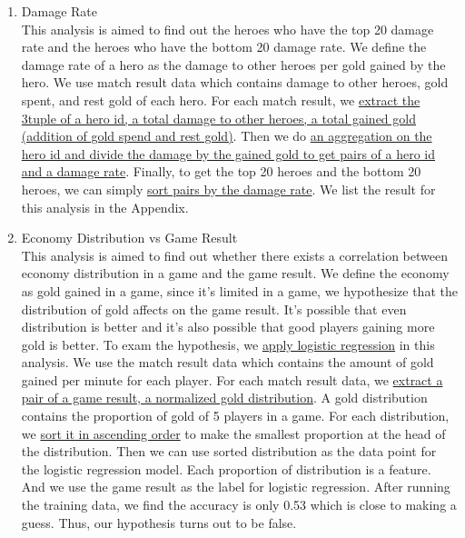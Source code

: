 \documentclass{article}
\begin{document}
\begin{enumerate}
    \item Damage Rate \\
    This analysis is aimed to find out the heroes who have the top 20 damage rate and the heroes who have the bottom 20 damage rate. We define the damage rate of a hero as the damage to other heroes per gold gained by the hero. We use match result data which contains damage to other heroes, gold spent, and rest gold of each hero. For each match result, we \href{https://github.com/Vopaaz/big-data-psg-lgd/blob/master/src/main/scala/DamageRate.scala#L39-L41}{extract the 3tuple of a hero id, a total damage to other heroes, a total gained gold (addition of gold spend and rest gold)}. Then we do \href{https://github.com/Vopaaz/big-data-psg-lgd/blob/master/src/main/scala/DamageRate.scala#L42-L44}{an aggregation on the hero id and divide the damage by the gained gold to get pairs of a hero id and a damage rate}. Finally, to get the top 20 heroes and the bottom 20 heroes, we can simply \href{https://github.com/Vopaaz/big-data-psg-lgd/blob/master/src/main/scala/DamageRate.scala#L47-L48}{sort pairs by the damage rate}. We list the result for this analysis in the Appendix.
    \item Economy Distribution vs Game Result \\
    This analysis is aimed to find out whether there exists a correlation between economy distribution in a game and the game result. We define the economy as gold gained in a game, since it's limited in a game, we hypothesize that the distribution of gold affects on the game result. It's possible that even distribution is better and it's also possible that good players gaining more gold is better. To exam the hypothesis, we \href{https://github.com/Vopaaz/big-data-psg-lgd/blob/master/src/main/scala/EcoDistributionTrain.scala#L48-L50}{apply logistic regression} in this analysis. We use the match result data which contains the amount of gold gained per minute for each player. For each match result data, we \href{https://github.com/Vopaaz/big-data-psg-lgd/blob/master/src/main/scala/EcoDistributionTrain.scala#L36-L42}{extract a pair of a game result, a normalized gold distribution}. A gold distribution contains the proportion of gold of 5 players in a game. For each distribution, we \href{https://github.com/Vopaaz/big-data-psg-lgd/blob/master/src/main/scala/EcoDistributionTrain.scala#L43-L44}{sort it in ascending order} to make the smallest proportion at the head of the distribution. Then we can use sorted distribution as the data point for the logistic regression model. Each proportion of distribution is a feature. And we use the game result as the label for logistic regression. After running the training data, we find the accuracy is only 0.53 which is close to making a guess. Thus, our hypothesis turns out to be false.

\end{enumerate}
\end{document}
